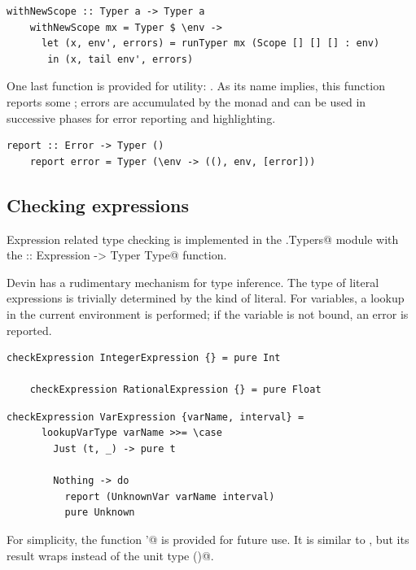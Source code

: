 \documentclass[UdineBachThesis,american,11pt]{PhdThesis}
\begin{document}
  \begin{lstlisting}[gobble=4,basicstyle=\ttfamily\small]
    withNewScope :: Typer a -> Typer a
    withNewScope mx = Typer $ \env ->
      let (x, env', errors) = runTyper mx (Scope [] [] [] : env)
       in (x, tail env', errors)
  \end{lstlisting}

  One last function is provided for utility: \lstinline@report@. As its name
  implies, this function reports some \lstinline@Error@; errors are accumulated
  by the \lstinline@Typer@ monad and can be used in successive phases for error
  reporting and highlighting.

  \begin{lstlisting}[gobble=4,basicstyle=\ttfamily\small]
    report :: Error -> Typer ()
    report error = Typer (\env -> ((), env, [error]))
  \end{lstlisting}

  \subsection{Checking expressions}

  Expression related type checking is implemented in the
  \lstinline@Devin.Typers@ module with the
  \lstinline@checkExpression :: Expression -> Typer Type@ function.

  Devin has a rudimentary mechanism for type inference. The type of literal
  expressions is trivially determined by the kind of literal. For variables, a
  lookup in the current environment is performed; if the variable is not bound,
  an error is reported.

  \begin{lstlisting}[gobble=4,basicstyle=\ttfamily\small]
    checkExpression IntegerExpression {} = pure Int

    checkExpression RationalExpression {} = pure Float
  \end{lstlisting}

  \newpage

  \begin{lstlisting}[gobble=4,basicstyle=\ttfamily\small]
    checkExpression VarExpression {varName, interval} =
      lookupVarType varName >>= \case
        Just (t, _) -> pure t

        Nothing -> do
          report (UnknownVar varName interval)
          pure Unknown
  \end{lstlisting}

  For simplicity, the function \lstinline@report'@ is provided for future use.
  It is similar to \lstinline@report@, but its result wraps
  \lstinline@Unknown@ instead of the unit type \lstinline@()@.
\end{document}
